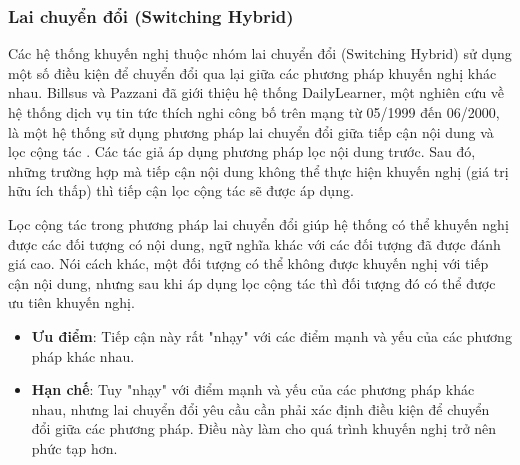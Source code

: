 \subsubsection{Lai chuyển đổi (Switching Hybrid)}
Các hệ thống khuyến nghị thuộc nhóm lai chuyển đổi (Switching Hybrid) sử dụng một số điều kiện để chuyển đổi qua lại giữa các phương pháp khuyến nghị khác nhau. Billsus và Pazzani đã giới thiệu hệ thống DailyLearner, một nghiên cứu về hệ thống dịch vụ tin tức thích nghi công bố trên mạng từ 05/1999 đến 06/2000, là một hệ thống sử dụng phương pháp lai chuyển đổi giữa tiếp cận nội dung và lọc cộng tác \cite{Billsus:2000:UMA:598285.598352}. Các tác giả áp dụng phương pháp lọc nội dung trước. Sau đó, những trường hợp mà tiếp cận nội dung không thể thực hiện khuyến nghị (giá trị hữu ích thấp) thì tiếp cận lọc cộng tác sẽ được áp dụng.

Lọc cộng tác trong phương pháp lai chuyển đổi giúp hệ thống có thể khuyến nghị được các đối tượng có nội dung, ngữ nghĩa khác với các đối tượng đã được đánh giá cao. Nói cách khác, một đối tượng có thể không được khuyến nghị với tiếp cận nội dung, nhưng sau khi áp dụng lọc cộng tác thì đối tượng đó có thể được ưu tiên khuyến nghị.

\begin{itemize}
	\item \textbf{Ưu điểm}: Tiếp cận này rất "nhạy" với các điểm mạnh và yếu của các phương pháp khác nhau.
\end{itemize}
\begin{itemize}
	\item \textbf{Hạn chế}: Tuy "nhạy" với điểm mạnh và yếu của các phương pháp khác nhau, nhưng lai chuyển đổi yêu cầu cần phải xác định điều kiện để chuyển đổi giữa các phương pháp. Điều này làm cho quá trình khuyến nghị trở nên phức tạp hơn.
\end{itemize}


